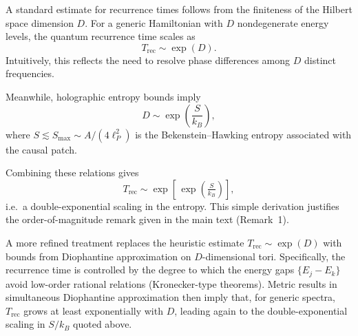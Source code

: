 \documentclass[12pt]{article}
\theoremstyle{remark}
\begin{document}
A standard estimate for recurrence times follows from the finiteness of the Hilbert space 
dimension $D$. For a generic Hamiltonian with $D$ nondegenerate energy levels, the 
quantum recurrence time scales as 
\begin{equation}
   T_{\mathrm{rec}} \sim \exp(D).
\end{equation}
Intuitively, this reflects the need to resolve phase differences among $D$ distinct 
frequencies. 

Meanwhile, holographic entropy bounds imply 
\begin{equation}
   D \sim \exp\!\left(\frac{S}{k_B}\right),
\end{equation}
where $S \lesssim S_{\max} \sim A/(4 \ell_P^2)$ is the Bekenstein--Hawking entropy 
associated with the causal patch. 

Combining these relations gives
\begin{equation}
   T_{\mathrm{rec}} \sim \exp\!\left[\,\exp\!\left(\tfrac{S}{k_B}\right)\right],
\end{equation}
i.e.\ a double-exponential scaling in the entropy. This simple derivation justifies the 
order-of-magnitude remark given in the main text (Remark~1).

A more refined treatment replaces the heuristic estimate $T_{\mathrm{rec}} \sim \exp(D)$ 
with bounds from Diophantine approximation on $D$-dimensional tori. 
Specifically, the recurrence time is controlled by the degree to which the energy 
gaps $\{E_j - E_k\}$ avoid low-order rational relations (Kronecker-type theorems). 
Metric results in simultaneous Diophantine approximation then imply that, 
for generic spectra, $T_{\mathrm{rec}}$ grows at least exponentially with $D$, 
leading again to the double-exponential scaling in $S/k_B$ quoted above.
\end{document}

